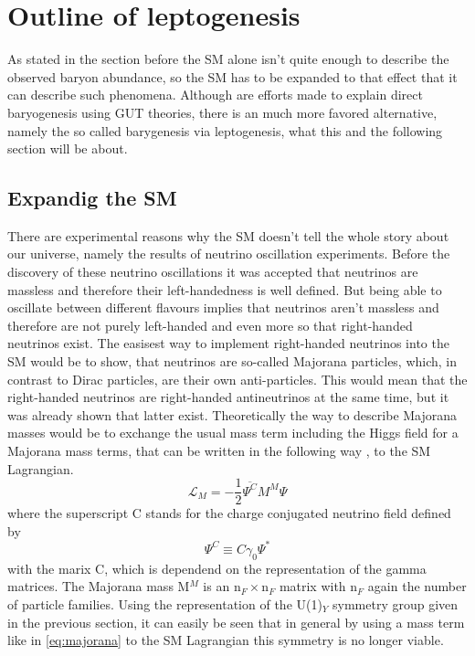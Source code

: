 \chapter{Outline of leptogenesis}
As stated in the section before the SM alone isn't quite enough to describe the observed baryon abundance, so the SM has to be expanded to that effect that it can describe such phenomena. \newline
Although are efforts made to explain direct baryogenesis using GUT theories, there is an much more favored alternative, namely the so called barygenesis via leptogenesis, what this and the following section will be about. 
\section{Expandig the SM}
There are experimental reasons why the SM doesn't tell the whole story about our universe, namely the results of neutrino oscillation experiments. Before the discovery of these neutrino oscillations it was accepted that neutrinos are massless and therefore their left-handedness is well defined. But being able to oscillate between different flavours implies that neutrinos aren't massless and therefore are not purely left-handed and even more so that right-handed neutrinos exist. The easisest way to implement right-handed neutrinos into the SM would be to show, that neutrinos are so-called Majorana particles, which, in contrast to Dirac particles, are their own anti-particles. This would mean that the right-handed neutrinos are right-handed antineutrinos at the same time, but it was already shown that latter exist. Theoretically the way to describe Majorana masses would be to exchange the usual mass term including the Higgs field for a Majorana mass terms, that can be written in the following way \cite[p. 18]{Taanila:2008}, to the SM Lagrangian.
\begin{equation*}
	\mathcal{L}_M=-\frac{1}{2}\overline{\Psi^C}M^M\Psi
	\label{eq:majorana}
\end{equation*}
where the superscript C stands for the charge conjugated neutrino field defined by
\begin{equation*}
	\Psi^C\equiv C\gamma_0\Psi^*
\end{equation*}
with the marix C, which is dependend on the representation of the gamma matrices. The Majorana mass M$^M$ is an n$_F\times$n$_F$ matrix with n$_F$ again the number of particle families. \newline
Using the representation of the U(1)$_Y$ symmetry group given in the previous section, it can easily be seen that in general by using a mass term like in \ref{eq:majorana} to the SM Lagrangian this symmetry is no longer viable.
